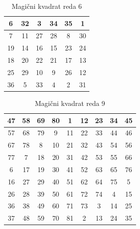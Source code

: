 \documentclass[a4paper,12pt]{article}
\theoremstyle{definition}
\theoremstyle{plain}
\newenvironment{magic}[3]
   {\begin{table}[!ht]
      \centering
      \caption{#2}
      \label{#3}
      \begin{tabular}{|*{#1}{c|}}
   }
   {\end{tabular}
      \end{table}}
\begin{document}
\begin{magic}{6}{Magični kvadrat reda 6}{table:mag6}
   \hline
   6 & 32 & 3 & 34 & 35 & 1 \\ \hline
   7 & 11 & 27 & 28 & 8 & 30 \\ \hline
   19 & 14 & 16 & 15 & 23 & 24 \\ \hline
   18 & 20 & 22 & 21 & 17 & 13 \\ \hline
   25 & 29 & 10 & 9 & 26 & 12 \\ \hline
   36 & 5 & 33 & 4 & 2 & 31 \\ \hline
\end{magic}

\begin{magic}{9}{Magični kvadrat reda 9}{table:mag9}
   \hline
   47 & 58 & 69 & 80 & 1 & 12 & 23 & 34 & 45 \\ \hline
   57 & 68 & 79 & 9 & 11 & 22 & 33 & 44 & 46 \\ \hline
   67 & 78 & 8 & 10 & 21 & 32 & 43 & 54 & 56 \\ \hline
   77 & 7 & 18 & 20 & 31 & 42 & 53 & 55 & 66 \\ \hline
   6 & 17 & 19 & 30 & 41 & 52 & 63 & 65 & 76 \\ \hline
   16 & 27 & 29 & 40 & 51 & 62 & 64 & 75 & 5 \\ \hline
   26 & 28 & 39 & 50 & 61 & 72 & 74 & 4 &15 \\ \hline
   36&38&49&60&71&73&3&14&25\\\hline
  37&48&59&70&81&2&13&24&35\\\hline
\end{magic}
\newpage




\end{document}
